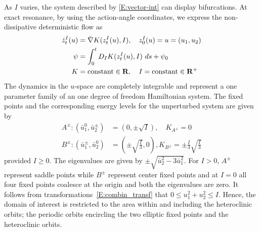
As $I$ varies, the system described by \eqref{E:vector-int} can display bifurcations. At exact resonance, by using the action-angle coordinates, we express the non-dissipative deterministic flow as
\begin{equation}
\label{E:hamilflow}
\begin{aligned}
\dot z_t^I(u) &= \bar{\nabla} K(z_t^I(u), I), \quad z_0^I(u)=u =(u_1,u_2)\\
\psi &= \int_{0}^{t} {D_{I} K(z_t^I(u), I) \ ds} + \psi_{0} \\ K
&= \text{constant} \in \mathbf R, \quad I = \text{constant} \in \mathbf R^+
\end{aligned}
\end{equation}
The dynamics in the $u$-space are completely integrable and represent a one parameter family of an one degree of freedom Hamiltonian system. The fixed points and the corresponding energy levels for the unperturbed system are given by
\begin{equation}
\begin{aligned}
A^\pm: (\bar u_1^{0}, \bar u_2^\pm) &= (0, \pm \sqrt{I}), \quad K_{A^\pm} = 0 \\
B^\pm: (\bar u_1^\pm, \bar u_2^{0}) & = (\pm \sqrt{\frac{I}{3}},0),  K_{B^\pm} = \pm\frac{I}{3}\sqrt{\frac{I}{3}}
\end{aligned}
\label{E:fixed-points}
\end{equation}
provided $ I \ge 0 $. The eigenvalues are given by $\pm \sqrt{\bar u_2^2-3 \bar u_1^2 }$. For $I > 0$, $A^\pm$ represent saddle points while $B^\pm$ represent center fixed points and at $I = 0$ all four fixed points coalesce at the origin and both the eigenvalues are zero. It follows from transformations~\eqref{E:combin_transf} that $0 \le u_1^2+u_2^2 \le I$. Hence, the domain of interest is restricted to the area within and including the heteroclinic orbits; the periodic orbits encircling the two elliptic fixed points and the heteroclinic orbits.

